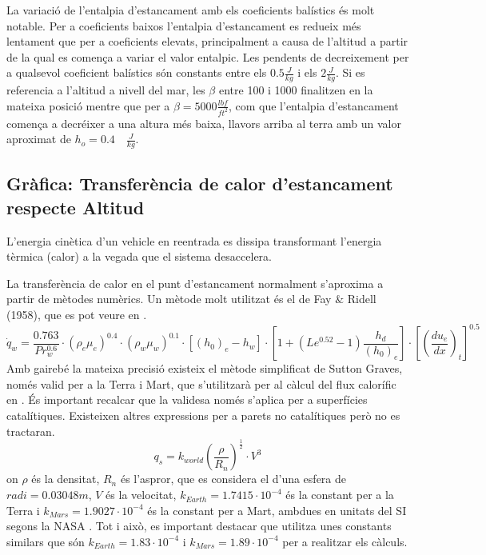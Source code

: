 La variació de l'entalpia d'estancament amb els coeficients balístics és molt notable. Per a coeficients baixos l'entalpia d'estancament es redueix més lentament que per a coeficients elevats, principalment a causa de l'altitud a partir de la qual es comença a variar el valor entalpic. Les pendents de decreixement per a qualsevol coeficient balístics són constants entre els $0.5 \frac{J}{kg}$ i els $2 \frac{J}{kg}$. Si es referencia a l'altitud a nivell del mar, les $\beta$ entre 100 i 1000 finalitzen en la mateixa posició mentre que per a $\beta = 5000 \frac{lbf}{ft^2}$, com que l'entalpia d'estancament comença a decréixer a una altura més baixa, llavors arriba al terra amb un valor aproximat de $h_o = 0.4 \quad \frac{J}{kg}$.

\newpage
\subsection{Gràfica: Transferència de calor d'estancament respecte Altitud}
L'energia cinètica d'un vehicle en reentrada es dissipa transformant l'energia tèrmica (calor) a la vegada que el sistema desaccelera.

La transferència de calor en el punt d'estancament normalment s'aproxima a partir de mètodes numèrics. Un mètode molt utilitzat és el de Fay $\&$ Ridell (1958), que es pot veure en \cite{adams}.
\begin{equation}
    \dot{q}_w=\frac{0.763}{Pr_w^{0.6}} \cdot (\rho_e\mu_e)^{0.4} \cdot (\rho_w\mu_w)^{0.1} \cdot [(h_0)_e-h_w] \cdot \left[1+(Le^{0.52}-1)\frac{h_d}{(h_0)_e}\right] \cdot \left[\left(\frac{du_e}{dx}\right)_t\right]^{0.5}
\end{equation}
Amb gairebé la mateixa precisió existeix el mètode simplificat de Sutton Graves, només valid per a la Terra i Mart, que s'utilitzarà per al càlcul del flux calorífic en \cite{aerothermodynamics}. És important recalcar que la validesa només s'aplica per a superfícies catalítiques. Existeixen altres expressions per a parets no catalítiques però no es tractaran.
\begin{equation}
    q_s = k_{world}\left(\frac{\rho}{R_n}\right)^{\frac{1}{2}} \cdot V^3
\end{equation}
on $\rho$ és la densitat, $R_n$ és l'aspror, que es considera el d'una esfera de $radi = 0.03048 m$, $V$ és la velocitat, $k_{Earth} = 1.7415 \cdot 10^{-4}$ és la constant per a la Terra i $k_{Mars} = 1.9027 \cdot 10^{-4}$ és la constant per a Mart, ambdues en unitats del SI segons la NASA \cite{aerothermodynamics}. Tot i això, es important destacar que \cite{adams} utilitza unes constants similars que són $k_{Earth} = 1.83 \cdot 10^{-4}$  i $k_{Mars} = 1.89 \cdot 10^{-4}$ per a realitzar els càlculs.

